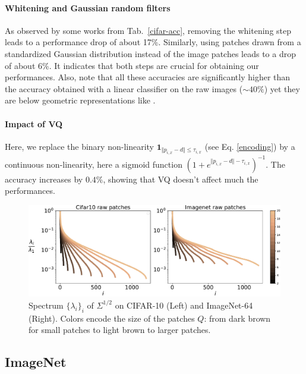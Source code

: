 \documentclass{article}
\begin{document}
\paragraph{Whitening and Gaussian random filters}As observed by some  works from Tab.~\ref{cifar-acc}, removing the whitening step leads to  a  performance drop  of about 17\%.
Similarly, using patches drawn from a standardized Gaussian distribution  instead of  the image patches leads to a drop of about 6\%. It indicates that both steps are crucial for obtaining our performances. 
Also, note that all these accuracies are significantly higher than the accuracy obtained with a linear classifier on the raw images ($\sim40\%$) yet they are below geometric representations like \cite{Oyallon_2015_CVPR}.

\paragraph{Impact of VQ}
Here, we replace the binary non-linearity  $\mathbf{1}_{\Vert  p_{i,x} - d\Vert \leq \tau_{i,x}}$ (see Eq. \ref{encoding}) by a continuous non-linearity, here a sigmoid function $(1 + e^{\Vert  p_{i,x} - d\Vert - \tau_{i,x}})^{-1}$.
The accuracy increases by $0.4\%$, showing that VQ  doesn't affect much the performances.

\begin{figure}
  \includegraphics[width=.9\linewidth]{figures/spectrum_patches}
  \caption{Spectrum $\{\lambda_i\}_i$ of $\Sigma^{1/2}$ on CIFAR-10 (Left) and ImageNet-64 (Right).\label{spectrum} Colors encode the size of the patches $Q$: from dark brown for small patches to light brown to larger patches.}
\end{figure}
\subsection{ImageNet}
\end{document}
